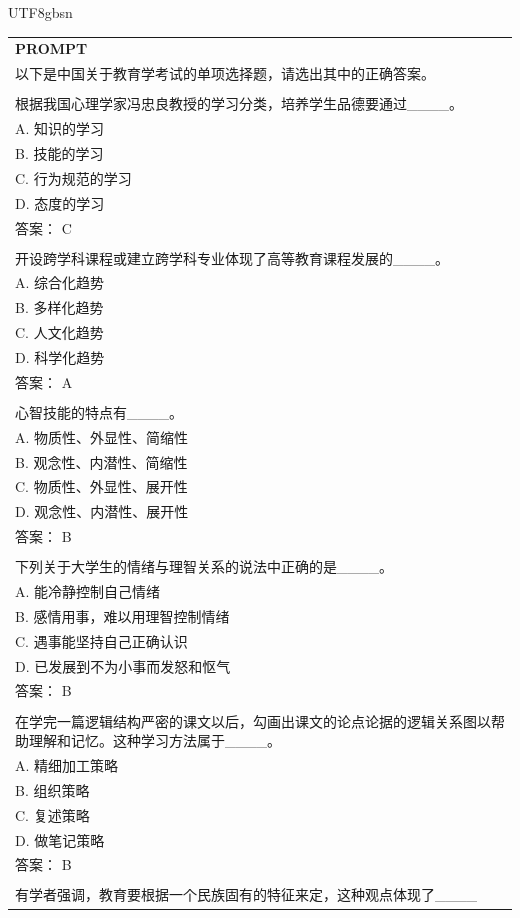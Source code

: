 \documentclass[11pt, a4paper, logo, copyright, nonumbering]{deepseek}
\begin{document}
\begin{CJK*}{UTF8}{gbsn}
\begin{table}[ht]
    \centering \small
\begin{tabular}{p{12cm}}
\toprule
\textbf{PROMPT}\\
以下是中国关于教育学考试的单项选择题，请选出其中的正确答案。
\\
\\根据我国心理学家冯忠良教授的学习分类，培养学生品德要通过\_\_\_\_。
\\A. 知识的学习
\\B. 技能的学习
\\C. 行为规范的学习
\\D. 态度的学习
\\答案： C
\\
\\开设跨学科课程或建立跨学科专业体现了高等教育课程发展的\_\_\_\_。
\\A. 综合化趋势
\\B. 多样化趋势
\\C. 人文化趋势
\\D. 科学化趋势
\\答案： A
\\
\\心智技能的特点有\_\_\_\_。
\\A. 物质性、外显性、简缩性
\\B. 观念性、内潜性、简缩性
\\C. 物质性、外显性、展开性
\\D. 观念性、内潜性、展开性
\\答案： B
\\
\\下列关于大学生的情绪与理智关系的说法中正确的是\_\_\_\_。
\\A. 能冷静控制自己情绪
\\B. 感情用事，难以用理智控制情绪
\\C. 遇事能坚持自己正确认识
\\D. 已发展到不为小事而发怒和怄气
\\答案： B
\\
\\在学完一篇逻辑结构严密的课文以后，勾画出课文的论点论据的逻辑关系图以帮助理解和记忆。这种学习方法属于\_\_\_\_。
\\A. 精细加工策略
\\B. 组织策略
\\C. 复述策略
\\D. 做笔记策略
\\答案： B
\\
\\有学者强调，教育要根据一个民族固有的特征来定，这种观点体现了\_\_\_\_

\end{tabular}
\end{table}
\end{CJK*}
\end{document}
